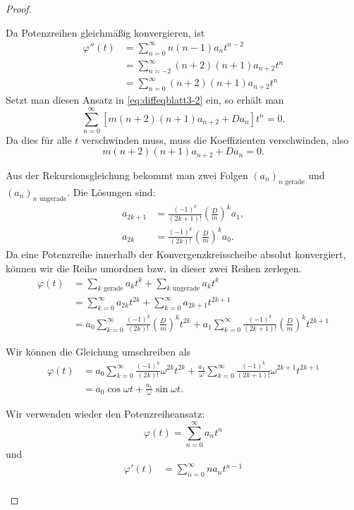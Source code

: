 \begin{proof}
	\begin{parts}
		\item Da Potenzreihen gleichmäßig konvergieren, ist
		\begin{align*}
		\varphi''(t)&=\sum_{n=0}^\infty n(n-1)a_n t^{n-2}\\
		&=\sum_{n=-2}^\infty (n+2)(n+1)a_{n+2}t^n\\
		&=\sum_{n=0}^\infty (n+2)(n+1)a_{n+2}t^n
	\end{align*}
	Setzt man diesen Ansatz in \eqref{eq:diffeqblatt3-2} ein, so erhält man
	\[\sum_{n=0}^\infty\left[m(n+2)(n+1)a_{n+2}+Da_n\right]t^n=0.\]
	Da dies f\"{u}r alle $t$ verschwinden muss, muss die Koeffizienten verschwinden, also
	\[
		m(n+2)(n+1)a_{n+2}+Da_n=0
	.\] 
\item Aus der Rekursionsgleichung bekommt man zwei Folgen $(a_n)_{n\text{ gerade}}$ und $(a_n)_{n\text{ ungerade}}$. Die L\"{o}sungen sind:
	\begin{align*}
		a_{2k+1}&=\frac{(-1)^k}{(2k+1)!}\left( \frac{D}{m} \right)^k a_1,\\
		a_{2k} &= \frac{(-1)^k}{(2k)!}\left( \frac{D}{m} \right)^k a_0.
	\end{align*}
	Da eine Potenzreihe innerhalb der Konvergenzkreisscheibe absolut konvergiert, können wir die Reihe umordnen bzw. in dieser zwei Reihen zerlegen.
	\begin{align*}
		\varphi(t) &= \sum_{k\text{ gerade}}a_k t^k + \sum_{k\text{ ungerade}} a_kt^k\\
			   &=\sum_{k=0}^\infty a_{2k} t^{2k}+\sum_{k=0}^\infty a_{2k+1}t^{2k+1}\\
			   &=a_0\sum_{k=0}^{\infty}\frac{(-1)^k}{(2k)!} \left( \frac{D}{m} \right)^k t^{2k} +a_1\sum_{k=0}^\infty \frac{(-1)^k}{(2k+1)!}\left( \frac{D}{m} \right)^{k}t^{2k+1}
	\end{align*}
\item Wir können die Gleichung umschreiben als
	\begin{align*}
		\varphi(t)&= a_0\sum_{k=0}^\infty \frac{(-1)^k}{(2k)!}\omega^{2k} t^{2k}+\frac{a_1}{\omega}\sum_{k=0}^\infty \frac{(-1)^k}{(2k+1)!}\omega^{2k+1}t^{2k+1}\\
			  &= a_0 \cos\omega t + \frac{a_1}{\omega}\sin \omega t.	
	\end{align*}
\item Wir verwenden wieder den Potenzreiheansatz:
	\[
	\varphi(t)=\sum_{n=0}^{\infty} a_n t^n
\]
und
\begin{align*}
	\varphi'(t)&=\sum_{n=0}^\infty n a_n t^{n-1}\\

\end{align*}
\end{parts}
\end{proof}
